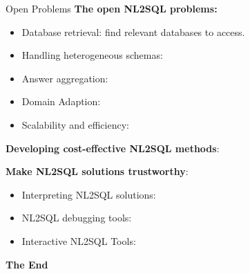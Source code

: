 \documentclass[aspectratio=169,xcolor=dvipsnames]{beamer}
\begin{document}
\begin{frame}{Open Problems}
\textbf{The open NL2SQL problems: }
\begin{itemize}
    \item Database retrieval: find relevant databases to access.
    \item Handling heterogeneous schemas:
    \item Answer aggregation:
    \item Domain Adaption:
    \item Scalability and efficiency:
\end{itemize}
\textbf{Developing cost-effective NL2SQL methods}:

\textbf{Make NL2SQL solutions trustworthy}:
\begin{itemize}
    \item Interpreting NL2SQL solutions:
    \item NL2SQL debugging tools:
    \item Interactive NL2SQL Tools:
\end{itemize}

\end{frame}


\begin{frame}
    \Huge{\centerline{\textbf{The End}}}
\end{frame}
\end{document}
